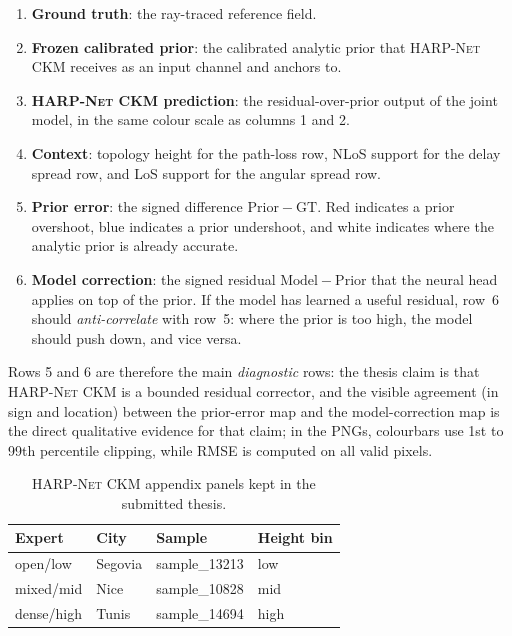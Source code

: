 \begin{enumerate}
\setlength\itemsep{0.15em}
  \item \textbf{Ground truth}: the ray-traced reference field.
  \item \textbf{Frozen calibrated prior}: the calibrated analytic prior
        that \textsc{HARP-Net CKM} receives as an input channel and anchors to.
  \item \textbf{\textsc{HARP-Net CKM} prediction}: the residual-over-prior output
        of the joint model, in the same colour scale as columns 1 and 2.
  \item \textbf{Context}: topology height for the path-loss row, NLoS
        support for the delay spread row, and LoS support for the
        angular spread row.
  \item \textbf{Prior error}: the signed difference
        \(\mathrm{Prior}-\mathrm{GT}\). Red indicates a prior overshoot,
        blue indicates a prior undershoot, and white indicates where the
        analytic prior is already accurate.
  \item \textbf{Model correction}: the signed residual
        \(\mathrm{Model}-\mathrm{Prior}\) that the neural head applies on
        top of the prior. If the model has learned a useful residual,
        row~6 should \emph{anti-correlate} with row~5: where the prior
        is too high, the model should push down, and vice versa.
\end{enumerate}

Rows 5 and 6 are therefore the main \emph{diagnostic} rows: the thesis
claim is that \textsc{HARP-Net CKM} is a bounded residual corrector, and the visible
agreement (in sign and location) between the prior-error map and the
model-correction map is the direct qualitative evidence for that claim; in the
PNGs, colourbars use 1st to 99th percentile clipping, while RMSE is computed on
all valid pixels.

\begin{table}[H]
\centering
\caption[Final-model appendix panel index.]%
{\textsc{HARP-Net CKM} appendix panels kept in the submitted thesis.}
\label{tab:try80_appendix_panels}
\footnotesize
\begin{tabular}{llll}
\toprule
Expert & City & Sample & Height bin \\
\midrule
open/low & Segovia & sample\_13213 & low \\
mixed/mid & Nice & sample\_10828 & mid \\
dense/high & Tunis & sample\_14694 & high \\
\bottomrule
\end{tabular}
\end{table}

